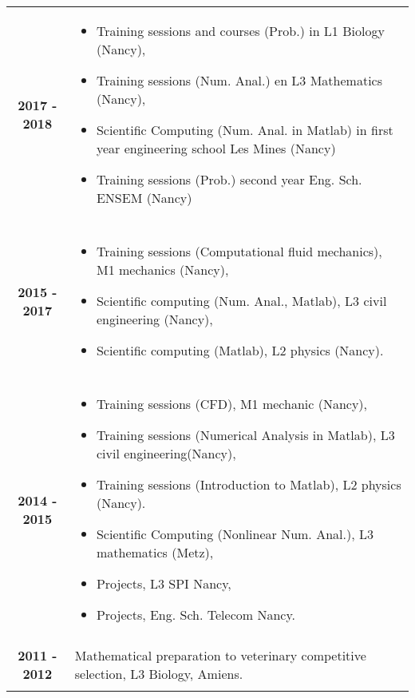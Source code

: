 \documentclass[10pt,a4paper]{report}
\begin{document}
\noindent
\begin{center}
\begin{tabular}{c p{12cm}}
\textbf{2017 - 2018} & \begin{itemize}
\item Training sessions and courses (Prob.) in L1 Biology (Nancy),
\item Training sessions (Num. Anal.) en L3 Mathematics (Nancy),
\item Scientific Computing (Num. Anal. in Matlab) in first year engineering school Les Mines (Nancy)
\item Training sessions (Prob.) second year Eng. Sch. ENSEM (Nancy)
\end{itemize}\\

& \\

\textbf{2015 - 2017} & \begin{itemize}
\item Training sessions (Computational fluid mechanics), M1 mechanics (Nancy),
\item Scientific computing (Num. Anal., Matlab), L3 civil engineering (Nancy),
\item Scientific computing (Matlab), L2 physics (Nancy).
\end{itemize}\\

& \\

\textbf{2014 - 2015} & \begin{itemize}
\item Training sessions (CFD), M1 mechanic (Nancy),
\item Training sessions (Numerical Analysis in Matlab), L3 civil engineering(Nancy),
\item Training sessions (Introduction to Matlab), L2 physics (Nancy).
\item Scientific Computing (Nonlinear Num. Anal.), L3 mathematics (Metz),
\item Projects, L3 SPI Nancy,
\item Projects, Eng. Sch. Telecom Nancy.
\end{itemize}\\

& \\

\textbf{2011 - 2012} & Mathematical preparation to veterinary competitive selection, L3 Biology, Amiens.\\

& \\
\end{tabular}
\end{center}
\end{document}
